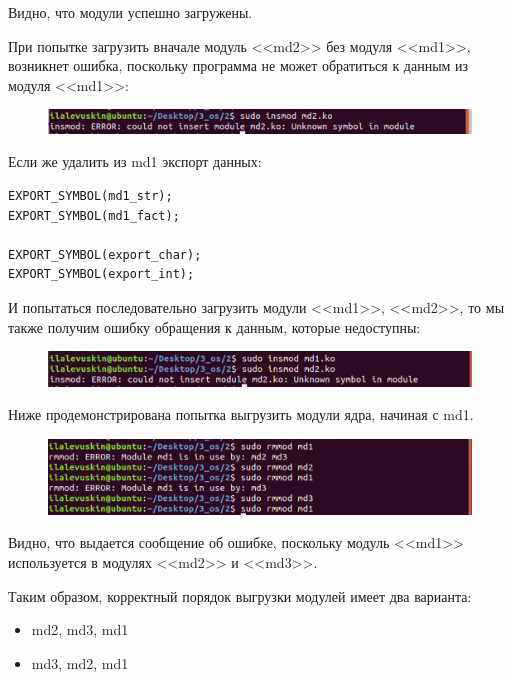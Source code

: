 \documentclass[a4paper,12pt]{article}
\begin{document}
	Видно, что модули успешно загружены.
	
	При попытке загрузить вначале модуль <<md2>> без модуля <<md1>>, возникнет ошибка, поскольку программа не может обратиться к данным из модуля <<md1>>:
	
	\begin{figure}[h!]
		\begin{center}
			{\includegraphics[scale = 0.7]{3.5.png}}
			\label{3.5}
		\end{center}
	\end{figure}

	Если же удалить из md1 экспорт данных:
	
	\begin{verbatim}
EXPORT_SYMBOL(md1_str);
EXPORT_SYMBOL(md1_fact);

EXPORT_SYMBOL(export_char);
EXPORT_SYMBOL(export_int);
	\end{verbatim}
	
	И попытаться последовательно загрузить модули <<md1>>, <<md2>>, то мы также получим ошибку обращения к данным, которые недоступны:
	
	\begin{figure}[h!]
		\begin{center}
			{\includegraphics[scale = 0.7]{3.6.png}}
			\label{3.6}
		\end{center}
	\end{figure}
	
	Ниже продемонстрирована попытка выгрузить модули ядра, начиная с md1.
	
	\begin{figure}[h!]
		\begin{center}
			{\includegraphics[scale = 0.7]{4.png}}
			\label{4}
		\end{center}
	\end{figure}
	
	Видно, что выдается сообщение об ошибке, поскольку модуль <<md1>> используется в модулях <<md2>> и <<md3>>.
	
	Таким образом, корректный порядок выгрузки модулей имеет два варианта:
	
	\begin{itemize}
		\item md2, md3, md1
		\item md3, md2, md1
	\end{itemize}
	
	
\end{document}
